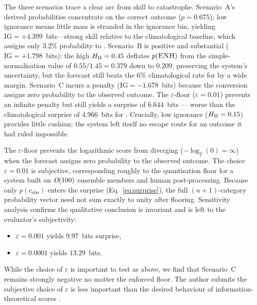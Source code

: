 The three scenarios trace a clear arc from skill to catastrophe.
Scenario~A's derived probabilities concentrate on the correct outcome
($p = 0.675$); low ignorance means little mass is stranded in the
ignorance bin, yielding $\mathrm{IG} = +4.399$~bits---strong
skill relative to the climatological baseline, which assigns only
$3.2\%$ probability to .
Scenario~B is positive and substantial ($\mathrm{IG} = +1.798$~bits):
the high $H_{\Pi} = 0.45$ deflates $p(\textsc{ENH})$ from the
simple-normalisation value of $0.55/1.45 = 0.379$ down to $0.209$,
preserving the system's uncertainty, but the forecast still
beats the $6\%$ climatological rate for  by a wide margin.
Scenario~C incurs a penalty ($\mathrm{IG} = -1.678$~bits) because the
conversion assigns zero probability to the observed outcome. The
$\varepsilon$-floor ($\varepsilon = 0.01$) prevents an infinite
penalty but still yields a surprise of $6.644$~bits --- worse than
the climatological surprise of $4.966$~bits for . Crucially,
low ignorance ($H_{\Pi} = 0.15$) provides little cushion: the system
left itself no escape route for an outcome it had ruled impossible.

The $\varepsilon$-floor prevents the logarithmic score
from diverging ($-\log_2(0) = \infty$) when the forecast assigns zero
probability to the observed outcome. The choice $\varepsilon = 0.01$
is subjective, corresponding roughly to the quantisation floor for a
system built on $\textit{O}(100)$ ensemble members and human
post-processing. Because only $p(c_{\mathrm{obs}})$ enters the
surprise (Eq.~\ref{eq:surprise}), the full $(n{+}1)$-category
probability vector need not sum exactly to unity after flooring.
Sensitivity analysis confirms the qualitative
conclusion is invariant and is left to the
evaluator's subjectivity:

\begin{itemize}
    \item $\varepsilon = 0.001$ yields $9.97$~bits surprise,
    \item $\varepsilon = 0.0001$ yields $13.29$~bits.
\end{itemize}

While the choice of $\varepsilon$ is important to
test as above,
we find that Scenario~C remains strongly negative
no matter the enforced floor.
The author submits the subjective choice of
$\varepsilon$ is less important than the desired
behaviour of information-theoretical
scores \citep{McCutcheon2019-jq}.


